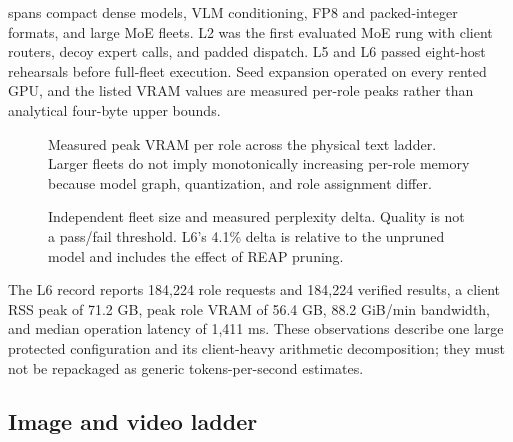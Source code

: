  spans compact dense models, VLM conditioning, FP8 and packed-integer formats, and large MoE fleets. L2 was the first evaluated MoE rung with client routers, decoy expert calls, and padded dispatch. L5 and L6 passed eight-host rehearsals before full-fleet execution. Seed expansion operated on every rented GPU, and the listed VRAM values are measured per-role peaks rather than analytical four-byte upper bounds.

\begin{figure}[htbp]
\centering

\caption{Measured peak VRAM per role across the physical text ladder. Larger fleets do not imply monotonically increasing per-role memory because model graph, quantization, and role assignment differ.}
\label{fig:text-resources}
\end{figure}

\begin{figure}[htbp]
\centering

\caption{Independent fleet size and measured perplexity delta. Quality is not a pass/fail threshold. L6's 4.1\% delta is relative to the unpruned model and includes the effect of REAP pruning.}
\label{fig:fleet-quality}
\end{figure}

The L6 record reports 184,224 role requests and 184,224 verified results, a client RSS peak of 71.2 GB, peak role VRAM of 56.4 GB, 88.2 GiB/min bandwidth, and median operation latency of 1,411 ms. These observations describe one large protected configuration and its client-heavy arithmetic decomposition; they must not be repackaged as generic tokens-per-second estimates.

\subsection{Image and video ladder}

